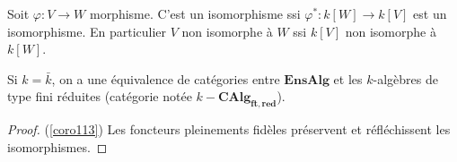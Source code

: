         \begin{coro}
            \label{coro113}
            Soit $\varphi : V \to W$ morphisme. C'est un isomorphisme ssi $\varphi^* : k[W] \to k[V]$ est un isomorphisme. En particulier $V$ non isomorphe à $W$ ssi $k[V]$ non isomorphe à $k[W]$.
        \end{coro}
        \begin{remq}
            Si $k = \bar k$, on a une équivalence de catégories entre $\mathbf{EnsAlg}$ et les $k$-algèbres de type fini réduites (catégorie notée $k-\mathbf{CAlg_{ft,red}}$).
        \end{remq}
        \begin{proof} (\ref{coro113})
            Les foncteurs pleinements fidèles préservent et réfléchissent les isomorphismes.
        \end{proof}
